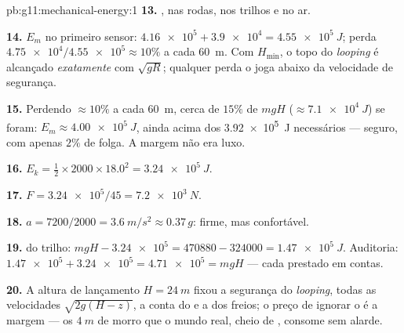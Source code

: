 \begin{solution}{pb:g11:mechanical-energy:1}
\textbf{13.} , nas rodas, nos trilhos e no ar.

\textbf{14.} $E_m$ no primeiro sensor:
$\num{4.16e5} + \num{3.9e4} = \qty{4.55e5}{J}$; perda
$\num{4.75e4}/\num{4.55e5} \approx 10\%$ a cada \qty{60}{m}. Com
$H_{\min}$, o topo do \emph{looping} é alcançado \emph{exatamente} com
$\sqrt{gR}$; qualquer perda o joga abaixo da velocidade de segurança.

\textbf{15.} Perdendo $\approx 10\%$ a cada \qty{60}{m}, cerca de $15\%$
de $mgH$ ($\approx \qty{7.1e4}{J}$) se foram:
$E_m \approx \qty{4.00e5}{J}$, ainda acima dos \qty{3.92e5}{J}
necessários --- seguro, com apenas $2\%$ de folga. A margem não era
luxo.

\textbf{16.} $E_k = \tfrac12 \times 2000 \times 18.0^2 =
\qty{3.24e5}{J}$.

\textbf{17.} $F = \num{3.24e5}/45 = \qty{7.2e3}{N}$.

\textbf{18.} $a = 7200/2000 = \qty{3.6}{m/s^2} \approx 0.37\,g$: firme,
mas confortável.

\textbf{19.}  do trilho:
$mgH - \num{3.24e5} = \num{470880} - \num{324000} = \qty{1.47e5}{J}$.
Auditoria: $\num{1.47e5} + \num{3.24e5} = \num{4.71e5} = mgH$ --- cada
 prestado em contas.

\textbf{20.} A altura de lançamento $H = \qty{24}{m}$ fixou a segurança
do \emph{looping}, todas as velocidades $\sqrt{2g(H - z)}$, a conta do
 e a  dos freios; o preço de ignorar o  é a margem ---
os $\qty{4}{m}$ de morro que o mundo real, cheio de , consome sem
alarde.
\end{solution}
